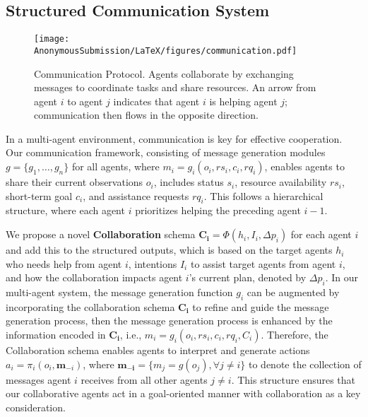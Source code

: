 \subsection{Structured Communication System}\label{sec:communication}
\begin{figure}[h]
  \centering
  \texttt{[image: AnonymousSubmission/LaTeX/figures/communication.pdf]}
  \caption{Communication Protocol. Agents collaborate by exchanging messages to coordinate tasks and share resources. An arrow from agent $i$ to agent $j$ indicates that agent $i$ is helping agent $j$; communication then flows in the opposite direction.}%
  \label{fig:communication_protocol}
    \vspace{-0.1in}
\end{figure}


In a multi-agent environment, communication is key for effective cooperation. Our communication framework, consisting of message generation modules $g=\{g_1,\dots,g_n\}$ for all agents, where $m_i = g_i (o_i,rs_i,c_i,rq_i)$, enables agents to share their current observations $o_i$, includes status $s_i$, resource availability $rs_i$, short-term goal %
$c_i$, and assistance requests $rq_i$. This follows a hierarchical structure, where each agent $i$ prioritizes helping the preceding agent $i-1$.

We propose a novel \textbf{Collaboration} schema $\boldsymbol{C_i}=\Phi(h_i, I_i, \Delta p_i)$ for each agent $i$ and add this to the structured outputs, which is based on the target agents $h_i$ who needs help from agent $i$, intentions $I_i$ to assist target agents from agent $i$, and how the collaboration impacts agent $i$'s current plan, denoted by $\Delta p_i$. In our multi-agent system, the message generation function $g_i$ can be augmented by incorporating the collaboration schema $\boldsymbol{C_i}$ to refine and guide the message generation process, then the message generation process is enhanced by the information encoded in $\boldsymbol{C_i}$, i.e., $m_i = g_i (o_i,rs_i,c_i,rq_i, C_i)$. Therefore, the Collaboration schema enables agents to interpret and generate actions $a_i=\pi_i(o_i,\boldsymbol{m}_{-i})$, where $\boldsymbol{m_{-i}}=\{m_{j}=g(o_j), \forall j \neq i\}$ to denote the collection of messages agent $i$ receives from all other agents $j \neq i$. This structure ensures that our collaborative agents act in a goal-oriented manner with collaboration as a key consideration. 

